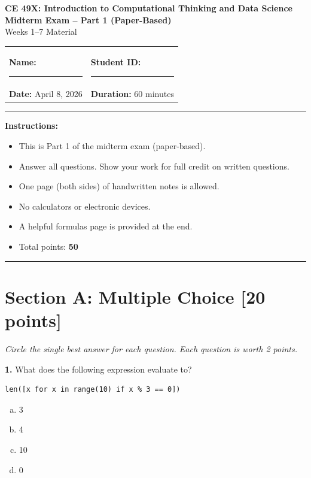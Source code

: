 \documentclass[11pt,a4paper]{article}
\begin{document}
\begin{center}
\Large\textbf{CE 49X: Introduction to Computational Thinking and Data Science}\\[0.1cm]
\large\textbf{Midterm Exam -- Part 1 (Paper-Based)}\\[0.05cm]
\normalsize Weeks 1--7 Material\\[0.2cm]
\end{center}

\noindent
\begin{tabular}{ll}
\textbf{Name:} \rule{8cm}{0.4pt} & \textbf{Student ID:} \rule{4cm}{0.4pt}\\[0.2cm]
\textbf{Date:} April 8, 2026 & \textbf{Duration:} 60 minutes
\end{tabular}

\vspace{0.2cm}
\noindent\rule{\linewidth}{1pt}

\noindent\textbf{Instructions:}
\begin{itemize}
\setlength\itemsep{0em}
\item This is Part 1 of the midterm exam (paper-based).
\item Answer all questions. Show your work for full credit on written questions.
\item One page (both sides) of handwritten notes is allowed.
\item No calculators or electronic devices.
\item A helpful formulas page is provided at the end.
\item Total points: \textbf{50}
\end{itemize}

\noindent\rule{\linewidth}{1pt}
\vspace{0.2cm}

\section*{Section A: Multiple Choice \hfill [20 points]}

\noindent \textit{Circle the single best answer for each question. Each question is worth 2 points.}

\vspace{0.3cm}

\noindent\textbf{1.} What does the following expression evaluate to?
\begin{lstlisting}
len([x for x in range(10) if x % 3 == 0])
\end{lstlisting}
\begin{enumerate}[(a)]
\item 3
\item 4
\item 10
\item 0
\end{enumerate}
\end{document}
